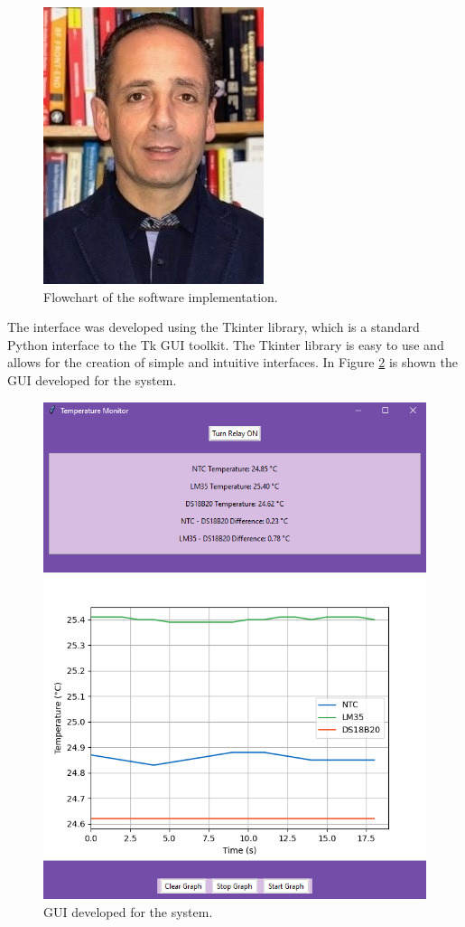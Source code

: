 \documentclass[12pt]{article}
\begin{document}
\begin{figure}[H] 
    \centering
    \includegraphics*[scale = 0.8]{images/jpoliveira.jpg}
    \caption{Flowchart of the software implementation.}
    \label{fig:flowchart}
\end{figure}

The interface was developed using the Tkinter library, which is a standard Python interface to the Tk GUI toolkit. The Tkinter library is easy to use and allows for the creation of simple and intuitive interfaces. In Figure \ref{fig:gui} is shown the GUI developed for the system.

\begin{figure}[H] 
    \centering
    \includegraphics*[scale = 0.4]{images/GUI-presentation.png}
    \caption{GUI developed for the system.}
    \label{fig:gui}
\end{figure}
\end{document}

